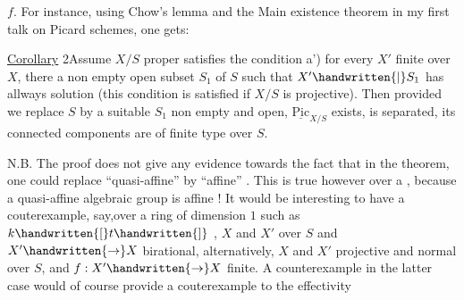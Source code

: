 $f$. For instance, using Chow's lemma and the Main existence theorem in my first talk on Picard schemes, one gets:

\uline{Corollary} 2\quad Assume $X/S$ proper satisfies the condition\unsure{;|:}  a') for every $X'$ finite over $X$, there  a non empty open subset $S_1$ of $S$ such that  $X'\handwritten{\mid}S_1$ has allways solution  (this condition is satisfied if $X/S$ is projective). Then  provided we replace $S$ by a suitable $S_1$ non empty and open, $\underline{\mathrm{Pic}}_{X/S}$ exists, is separated, its connected components are of finite type over $S$.

N.B. The proof does not give any evidence towards the fact that in the theorem, one could replace ``quasi-affine'' by ``affine'' . This is true however over a , because a quasi-affine algebraic group is affine ! It would be interesting to have a couterexample, say,over a  ring of dimension $1$ such as $k\handwritten{[}t\handwritten{]}$ , $X$ and $X'$
\reversemarginpar
{}
\normalmarginpar
\noindent over $S$ and $X'\handwritten{\to}X$ birational, alternatively,  $X$ and $X'$ projective and normal over $S$, and $f:X'\handwritten{\to}X$ finite. A counterexample in the latter case would of course provide a couterexample to the effectivity


